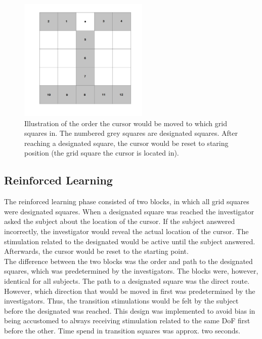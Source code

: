 \begin{figure}[H]                 
	\includegraphics[width=0.55\textwidth]{figures/gridmap_FBfam}  
	\caption{Illustration of the order the cursor would be moved to which grid squares in. The numbered grey squares are designated squares. After reaching a designated square, the cursor would be reset to staring position (the grid square the cursor is located in).}
	\label{fig:gridmap_FBfam} 
\end{figure}

\subsection{Reinforced Learning} \label{sec:meth:FBtrainingRe}
The reinforced learning phase consisted of two blocks, in which all grid squares were designated squares. When a designated square was reached the investigator asked the subject about the location of the cursor. If the subject answered incorrectly, the investigator would reveal the actual location of the cursor. The stimulation related to the designated would be active until the subject answered. Afterwards, the cursor would be reset to the starting point. \\
The difference between the two blocks was the order and path to the designated squares, which was predetermined by the investigators. The blocks were, however, identical for all subjects. The path to a designated square was the direct route. However, which direction that would be moved in first was predetermined by the investigators. Thus, the transition stimulations would be felt by the subject before the designated was reached. This design was implemented to avoid bias in being accustomed to always receiving stimulation related to the same DoF first before the other. Time spend in transition squares was approx. two seconds. 